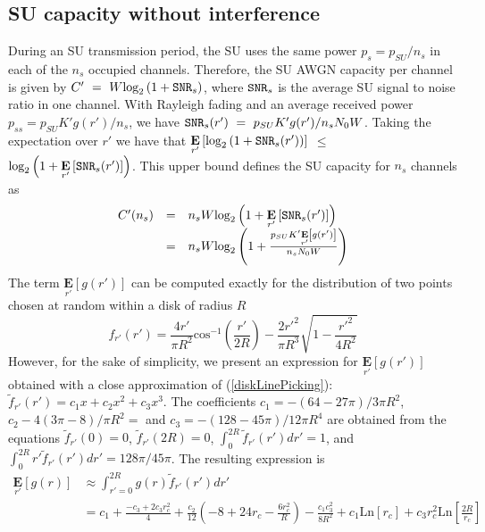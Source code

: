 \subsection{SU capacity without interference}
During an SU transmission period, the SU uses the same power $p_{s}=p_{SU}/n_{s}$ in each of the $n_{s}$ occupied channels. Therefore, the SU AWGN capacity per channel is given by $C'~=~W\text{log}_{2}\left(1+\text{\ttfamily{SNR}}_{s}\right)$, where $\text{\ttfamily{SNR}}_{s}$ is the average SU signal to noise ratio in one channel. With Rayleigh fading and an average received power $p_{ss}=p_{SU}K'g(r')/n_{s}$, we have $\text{\ttfamily{SNR}}_{s}(r')~=~p_{SU}K'g(r')/n_{s}N_{0}W$.
Taking the expectation over $r'$ we have that $\underset{r'}{\mathbf{E}}\left[\text{log}_{2}\left(1+\text{\ttfamily{SNR}}_{s}(r')\right)\right]$ $\leq$ $\text{log}_{2}\left(1+\underset{r'}{\mathbf{E}}\left[\text{\ttfamily{SNR}}_{s}(r')\right]\right)$. This upper bound defines the SU capacity for $n_{s}$ channels as
\begin{equation}
\begin{array}{lcl}
C'(n_{s}) & = & n_{s}W\text{log}_{2}\left(1+\underset{r'}{\mathbf{E}}\left[\text{\ttfamily{SNR}}_{s}(r')\right]\right)\\
&=& n_{s}W\text{log}_{2}\left(1+\frac{p_{SU}K'\underset{r'}{\mathbf{E}}\left[g(r')\right]}{n_{s}N_{0}W}\right)
\end{array}
\end{equation}
The term $\underset{r'}{\mathbf{E}}\left[g(r')\right]$ can be computed exactly for the distribution of two points chosen at random within a disk of radius $R$
\begin{equation}\label{diskLinePicking}
f_{r'}\left(r'\right) = \displaystyle\frac{4r'}{\pi R^{2}}\text{cos}^{-1}\left(\displaystyle\frac{r'}{2R}\right) - \displaystyle\frac{2r'^{2}}{\pi R^{3}}\sqrt{1-\displaystyle\frac{r'^{2}}{4R^{2}}}
\end{equation}
However, for the sake of simplicity, we present an expression for $\underset{r'}{\mathbf{E}}\left[g(r')\right]$ obtained with a close approximation of (\ref{diskLinePicking}): $\tilde{f}_{r'}\left(r'\right) = c_{1}x+c_{2}x^2+c_{3}x^{3}$. The coefficients $c_{1}=-(64-27\pi)/3\pi R^{2}$, $c_{2}-4(3\pi-8)/\pi R^{2}=$ and $c_{3}=-(128-45\pi)/12\pi R^{4}$ are obtained from the equations $\tilde{f}_{r'}(0)=0$, $\tilde{f}_{r'}(2R)=0$, $\int_{0}^{2R}\tilde{f}_{r'}(r')dr'=1$, and $\int_{0}^{2R}r'\tilde{f}_{r'}(r')dr'=128\pi/45\pi$. The resulting expression is
\begin{equation}\label{Egrprime}
\begin{array}{ll}
\underset{r'}{\mathbf{E}}\left[g(r)\right] & \approx \displaystyle\int_{r'=0}^{2R}g(r)\tilde{f}_{r'}(r')dr'\\
& = c_{1}+\frac{-c_{3}+2c_{3}r_{c}^{2}}{4} + \frac{c_{2}}{12}\left(-8+24r_{c}-\frac{6r_{c}^{2}}{R}\right) -\frac{c_{1} c_{3}^{2}}{8 R^{2}}+c_{1}\text{Ln}[r_{c}]+c_{3} r_{c}^{2} \text{Ln}\left[\frac{2 R}{r_{c}}\right]
\end{array}
\end{equation}

